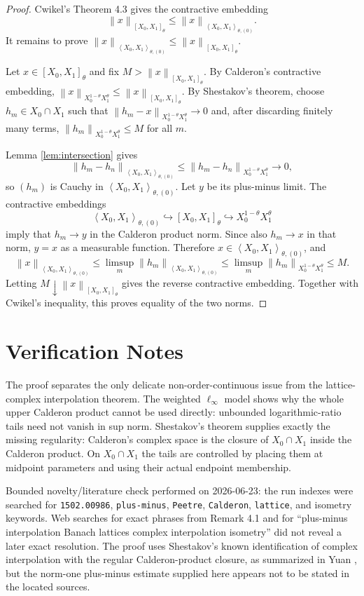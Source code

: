 \documentclass[11pt]{article}
\newcommand{\PM}{\left\langle X_0,X_1\right\rangle_{\theta,(0)}}
\newcommand{\Cplx}{\left[X_0,X_1\right]_\theta}
\newcommand{\Cal}{X_0^{1-\theta}X_1^\theta}
\newcommand{\norm}[1]{\left\lVert #1\right\rVert}
\begin{document}
\begin{proof}
Cwikel's Theorem 4.3 gives the contractive embedding
\[
\norm{x}_{\Cplx}\le \norm{x}_{\PM}.
\]
It remains to prove $\norm{x}_{\PM}\le\norm{x}_{\Cplx}$.

Let $x\in\Cplx$ and fix $M>\norm{x}_{\Cplx}$.  By Calderon's
contractive embedding, $\norm{x}_{\Cal}\le\norm{x}_{\Cplx}$.  By
Shestakov's theorem, choose $h_m\in X_0\cap X_1$ such that
$\norm{h_m-x}_{\Cal}\to0$ and, after discarding finitely many terms,
$\norm{h_m}_{\Cal}\le M$ for all $m$.

Lemma \ref{lem:intersection} gives
\[
\norm{h_m-h_n}_{\PM}\le\norm{h_m-h_n}_{\Cal}\to0,
\]
so $(h_m)$ is Cauchy in $\PM$.  Let $y$ be its plus-minus limit.  The
contractive embeddings
\[
\PM\hookrightarrow \Cplx\hookrightarrow \Cal
\]
imply that $h_m\to y$ in the Calderon product norm.  Since also
$h_m\to x$ in that norm, $y=x$ as a measurable function.  Therefore
$x\in\PM$, and
\[
\norm{x}_{\PM}\le\limsup_m\norm{h_m}_{\PM}
\le\limsup_m\norm{h_m}_{\Cal}\le M.
\]
Letting $M\downarrow\norm{x}_{\Cplx}$ gives the reverse contractive
embedding.  Together with Cwikel's inequality, this proves equality of
the two norms.
\end{proof}

\section*{Verification Notes}

The proof separates the only delicate non-order-continuous issue from
the lattice-complex interpolation theorem.  The weighted
$\ell_\infty$ model shows why the whole upper Calderon product cannot be
used directly: unbounded logarithmic-ratio tails need not vanish in
sup norm.  Shestakov's theorem supplies exactly the missing regularity:
Calderon's complex space is the closure of $X_0\cap X_1$ inside the
Calderon product.  On $X_0\cap X_1$ the tails are controlled by placing
them at midpoint parameters and using their actual endpoint membership.

Bounded novelty/literature check performed on 2026-06-23: the run
indexes were searched for \texttt{1502.00986}, \texttt{plus-minus},
\texttt{Peetre}, \texttt{Calderon}, \texttt{lattice}, and isometry
keywords.  Web searches for exact phrases from Remark 4.1 and for
``plus-minus interpolation Banach lattices complex interpolation
isometry'' did not reveal a later exact resolution.  The proof uses
Shestakov's known identification of complex interpolation with the
regular Calderon-product closure, as summarized in Yuan \cite{Yuan2014},
but the norm-one plus-minus estimate supplied here appears not to be
stated in the located sources.
\end{document}
